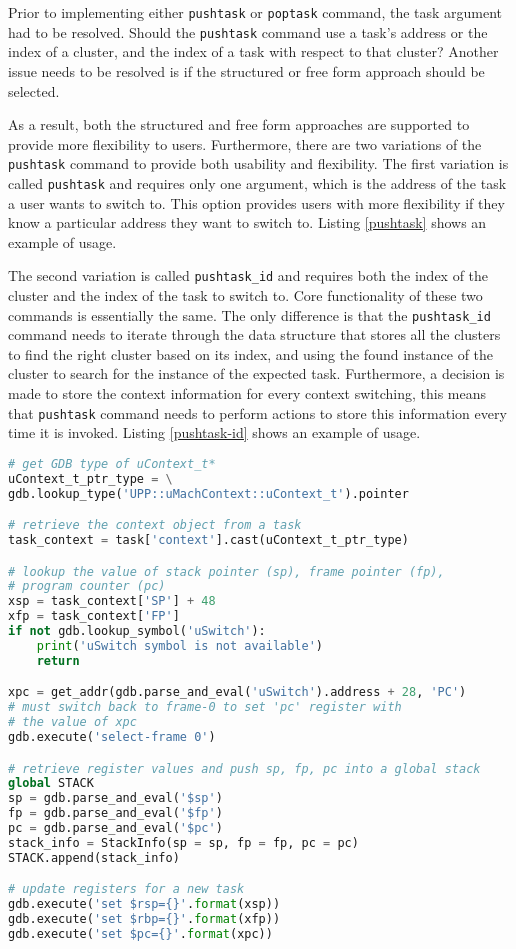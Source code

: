 Prior to implementing either \verb|pushtask| or \verb|poptask| command, the
task argument had to be resolved. Should the \verb|pushtask| command use a task's address or the index of a cluster, and the index of a task with respect
to that cluster? Another issue needs to be resolved is if the structured or free
form approach should be selected.

As a result, both the structured and free form approaches are supported to
provide more flexibility to users. Furthermore, there are two variations of the \verb|pushtask| command to provide both usability and flexibility. The first variation is called \verb|pushtask| and requires
only one argument, which is the address of the task a user wants to switch to.
This option provides users with more flexibility if they know a
particular address they want to switch to. Listing \ref{pushtask} shows an example
of usage.

The second variation is called \verb|pushtask_id| and requires both the index of
the cluster and the index of the task to switch to. Core functionality of these two commands is
essentially the same. The only difference is that the \verb|pushtask_id| command
needs to iterate through the data structure that stores all the clusters to find
the right cluster based on its index, and using the found instance of the
cluster to search for the instance of the expected task. Furthermore, a decision
is made to store the context information for every context switching, this means
that \verb|pushtask| command needs to perform actions to store this information every time it is
invoked. Listing \ref{pushtask-id} shows an example of usage.

\begin{lstlisting}[language=Python, caption={Abridged \text{push\_task} source
code},
label={pushtask-code}]
# get GDB type of uContext_t*
uContext_t_ptr_type = \
gdb.lookup_type('UPP::uMachContext::uContext_t').pointer

# retrieve the context object from a task
task_context = task['context'].cast(uContext_t_ptr_type)

# lookup the value of stack pointer (sp), frame pointer (fp),
# program counter (pc)
xsp = task_context['SP'] + 48
xfp = task_context['FP']
if not gdb.lookup_symbol('uSwitch'):
    print('uSwitch symbol is not available')
    return

xpc = get_addr(gdb.parse_and_eval('uSwitch').address + 28, 'PC')
# must switch back to frame-0 to set 'pc' register with
# the value of xpc
gdb.execute('select-frame 0')

# retrieve register values and push sp, fp, pc into a global stack
global STACK
sp = gdb.parse_and_eval('$sp')
fp = gdb.parse_and_eval('$fp')
pc = gdb.parse_and_eval('$pc')
stack_info = StackInfo(sp = sp, fp = fp, pc = pc)
STACK.append(stack_info)

# update registers for a new task
gdb.execute('set $rsp={}'.format(xsp))
gdb.execute('set $rbp={}'.format(xfp))
gdb.execute('set $pc={}'.format(xpc))
\end{lstlisting}

